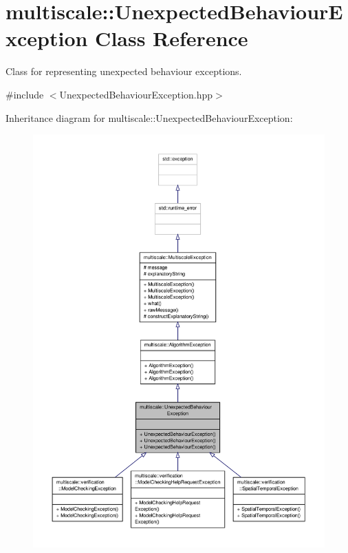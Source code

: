 \hypertarget{classmultiscale_1_1UnexpectedBehaviourException}{\section{multiscale\-:\-:Unexpected\-Behaviour\-Exception Class Reference}
\label{classmultiscale_1_1UnexpectedBehaviourException}
}


Class for representing unexpected behaviour exceptions.  




{\ttfamily \#include $<$Unexpected\-Behaviour\-Exception.\-hpp$>$}



Inheritance diagram for multiscale\-:\-:Unexpected\-Behaviour\-Exception\-:\nopagebreak
\begin{figure}[H]
\begin{center}
\leavevmode
\includegraphics[width=350pt]{classmultiscale_1_1UnexpectedBehaviourException__inherit__graph}
\end{center}
\end{figure}


